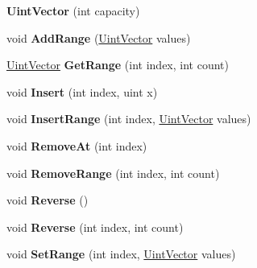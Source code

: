 \begin{DoxyCompactItemize}
\item 
\hypertarget{class_uint_vector_a09af60604cf7a8db3518f3fdbc237957}{{\bfseries Uint\+Vector} (int capacity)}\label{class_uint_vector_a09af60604cf7a8db3518f3fdbc237957}

\item 
\hypertarget{class_uint_vector_aa5aa845a2dd4fd7cbf95bda808d27796}{void {\bfseries Add\+Range} (\hyperlink{class_uint_vector}{Uint\+Vector} values)}\label{class_uint_vector_aa5aa845a2dd4fd7cbf95bda808d27796}

\item 
\hypertarget{class_uint_vector_abf92429b5df3338b87d81c41446fd5d2}{\hyperlink{class_uint_vector}{Uint\+Vector} {\bfseries Get\+Range} (int index, int count)}\label{class_uint_vector_abf92429b5df3338b87d81c41446fd5d2}

\item 
\hypertarget{class_uint_vector_a730eb3a08fe8eaf6f556a5bd1a93382a}{void {\bfseries Insert} (int index, uint x)}\label{class_uint_vector_a730eb3a08fe8eaf6f556a5bd1a93382a}

\item 
\hypertarget{class_uint_vector_a913fd55c93e02b0aff04e85b97d61fa4}{void {\bfseries Insert\+Range} (int index, \hyperlink{class_uint_vector}{Uint\+Vector} values)}\label{class_uint_vector_a913fd55c93e02b0aff04e85b97d61fa4}

\item 
\hypertarget{class_uint_vector_ae98bb5c609de9c228b30fa13a5ff996e}{void {\bfseries Remove\+At} (int index)}\label{class_uint_vector_ae98bb5c609de9c228b30fa13a5ff996e}

\item 
\hypertarget{class_uint_vector_a4e121ed6b6c5a82d2ca035420bc55166}{void {\bfseries Remove\+Range} (int index, int count)}\label{class_uint_vector_a4e121ed6b6c5a82d2ca035420bc55166}

\item 
\hypertarget{class_uint_vector_a84c27e2e8789f893206a4ccb011b38e9}{void {\bfseries Reverse} ()}\label{class_uint_vector_a84c27e2e8789f893206a4ccb011b38e9}

\item 
\hypertarget{class_uint_vector_a40c83ec6ef9182055f80385d8fb4d6d5}{void {\bfseries Reverse} (int index, int count)}\label{class_uint_vector_a40c83ec6ef9182055f80385d8fb4d6d5}

\item 
\hypertarget{class_uint_vector_ad955b430e31e8142cb12cb7a0e5b5f3a}{void {\bfseries Set\+Range} (int index, \hyperlink{class_uint_vector}{Uint\+Vector} values)}\label{class_uint_vector_ad955b430e31e8142cb12cb7a0e5b5f3a}


\end{DoxyCompactItemize}
